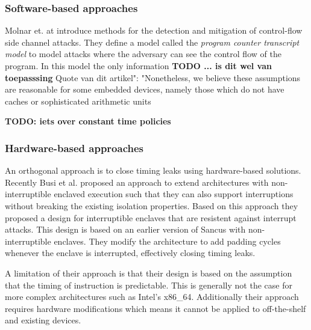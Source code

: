 \subsubsection{Software-based approaches}

Molnar et. at \cite{programcounter} introduce methods for the detection and mitigation of control-flow side channel attacks.
They define a model called the \textit{program counter transcript model} to model attacks where the adversary can see the control flow of the program. 
In this model the only information 
\textbf{TODO ... is dit wel van toepasssing}
Quote van dit artikel": "Nonetheless, we believe these assumptions are reasonable for some embedded devices, namely those which do not have caches or
sophisticated arithmetic units

\textbf{TODO: iets over constant time policies}
 

\subsubsection{Hardware-based approaches}
An orthogonal approach is to close timing leaks using hardware-based solutions. 
Recently Busi et al. \cite{busi} proposed an approach to extend architectures with non-interruptible enclaved execution such that they can also support interruptions without breaking 
the existing isolation properties. Based on this approach they proposed  a design for interruptible enclaves that are resistent against interrupt attacks. 
This design is based on an earlier version of Sancus with non-interruptible enclaves. They modify the architecture to add padding cycles whenever the enclave is interrupted, effectively closing timing leaks. 

A limitation of their approach is that their design is based on the assumption that the timing of instruction is predictable. This is generally not the case for more complex architectures such as Intel's x86\_64.
Additionally their approach requires hardware modifications which means it cannot be applied to off-the-shelf and existing devices. 



